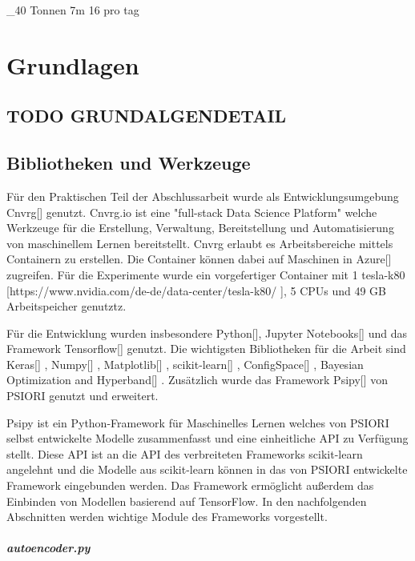 \_40 Tonnen
7m
16 pro tag





\chapter{Grundlagen}
\label{chap:Grundlagen}

	\section{TODO GRUNDALGENDETAIL}
	\label{sec:TODOGrundlagenDetail}
	
	\section{Bibliotheken und Werkzeuge}
	\label{sec:BibliothekenundWerkzeuge}
	Für den Praktischen Teil der Abschlussarbeit wurde als Entwicklungsumgebung Cnvrg[] genutzt. Cnvrg.io ist eine "full-stack Data Science Platform" welche Werkzeuge für die Erstellung, Verwaltung, Bereitstellung und Automatisierung von maschinellem Lernen bereitstellt. Cnvrg erlaubt es Arbeitsbereiche mittels Containern zu erstellen. Die Container können dabei auf Maschinen in Azure[] zugreifen. Für die Experimente wurde ein vorgefertiger Container mit 1 tesla-k80 [https://www.nvidia.com/de-de/data-center/tesla-k80/ ], 5 CPUs 	und 49 GB Arbeitspeicher genutztz.
	
	Für die Entwicklung wurden insbesondere Python[], Jupyter Notebooks[] und das Framework Tensorflow[]  genutzt. Die wichtigsten Bibliotheken für die Arbeit sind Keras[] , Numpy[] , Matplotlib[] , scikit-learn[] , ConfigSpace[] , Bayesian Optimization and Hyperband[] .  Zusätzlich wurde das  Framework  Psipy[]   von PSIORI genutzt und erweitert. 
	
	Psipy ist ein Python-Framework für Maschinelles Lernen welches von PSIORI selbst entwickelte Modelle zusammenfasst und eine einheitliche API zu Verfügung stellt. Diese API ist an die API des verbreiteten Frameworks scikit-learn angelehnt und die Modelle aus scikit-learn können in das von PSIORI entwickelte Framework eingebunden werden. Das Framework ermöglicht außerdem das Einbinden von Modellen basierend auf TensorFlow.
	In den nachfolgenden Abschnitten werden wichtige Module des Frameworks vorgestellt.	
	\paragraph{autoencoder.py} 
